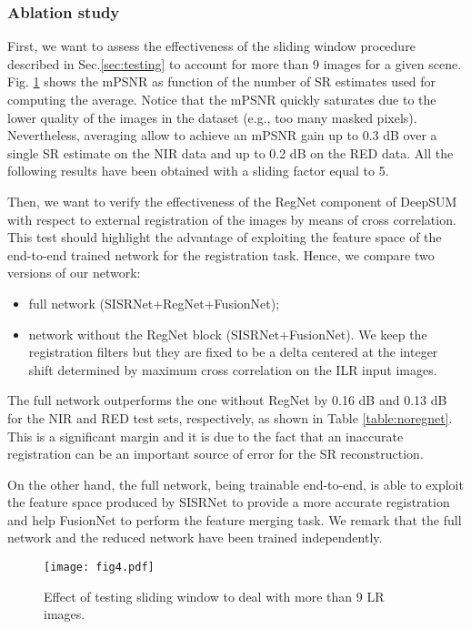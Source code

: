 \documentclass[journal]{IEEEtran}
\begin{document}
\subsubsection{Ablation study}

First, we want to assess the effectiveness of the sliding window procedure described in Sec.\ref{sec:testing} to account for more than 9 images for a given scene. Fig. \ref{fig:sliding} shows the mPSNR as function of the number of SR estimates used for computing the average. Notice that the mPSNR quickly saturates due to the lower quality of the images in the dataset (e.g., too many masked pixels). Nevertheless, averaging allow to achieve an mPSNR gain up to 0.3 dB over a single SR estimate on the NIR data and up to 0.2 dB on the RED  data. All the following results have been obtained with a sliding factor equal to 5. 

Then, we want to verify the effectiveness of the RegNet component of DeepSUM with respect to external registration of the images by means of cross correlation. This test should highlight the advantage of exploiting the feature space of the end-to-end trained network for the registration task. Hence, we compare two versions of our network: 
 
\begin{itemize}
    \item full network (SISRNet+RegNet+FusionNet);
    \item network without the RegNet block (SISRNet+FusionNet).
We keep the registration filters but they are fixed to be a delta centered at the integer shift determined by maximum cross correlation on the ILR input images.
\end{itemize}
The full network outperforms the one without RegNet by 0.16 dB and 0.13 dB for the NIR and RED test sets, respectively, as shown in Table \ref{table:noregnet}. 
This is a significant margin and it is due to the fact that an inaccurate registration can be an important source of error for the SR reconstruction.


On the other hand, the full network, being trainable end-to-end, is able to exploit the feature space produced by SISRNet to provide a more accurate registration and help FusionNet to perform the feature merging task.
We remark that the full network and the reduced network have been trained independently.


\begin{figure}[t]
    \centering
    \texttt{[image: fig4.pdf]}
    \caption{Effect of testing sliding window to deal with more than 9 LR images.}
    \label{fig:sliding}
\end{figure}
\end{document}
